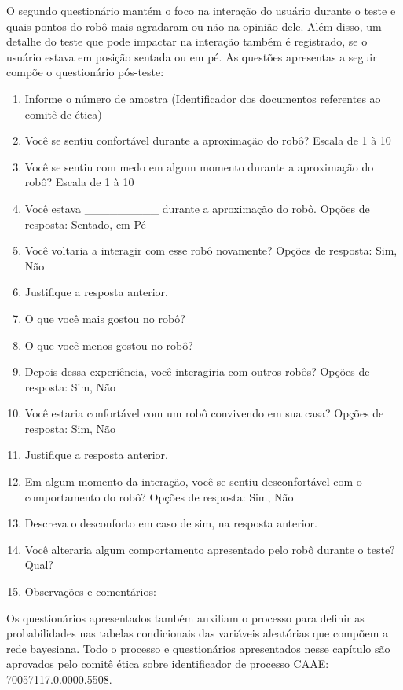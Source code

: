 O segundo questionário mantém o foco na interação do usuário durante o teste e quais pontos do robô mais agradaram ou não na opinião dele. Além disso, um detalhe do teste que pode impactar na interação também é registrado, se o usuário estava em posição sentada ou em pé. As questões apresentas a seguir compõe o questionário pós-teste:

\begin{enumerate}
	\item Informe o número de amostra (Identificador dos documentos referentes ao comitê de ética)
	\item Você se sentiu confortável durante a aproximação do robô? Escala de 1 à 10
	\item Você se sentiu com medo em algum momento durante a aproximação do robô? Escala de 1 à 10
	\item Você estava \_\_\_\_\_\_\_\_\_ durante a aproximação do robô. Opções de resposta: Sentado, em Pé
	\item Você voltaria a interagir com esse robô novamente? Opções de resposta: Sim, Não
	\item Justifique a resposta anterior.
	\item O que você mais gostou no robô?
	\item O que você menos gostou no robô?
	\item Depois dessa experiência, você interagiria com outros robôs? Opções de resposta: Sim, Não
	\item Você estaria confortável com um robô convivendo em sua casa? Opções de resposta: Sim, Não
	\item Justifique a resposta anterior.
	\item Em algum momento da interação, você se sentiu desconfortável com o comportamento do robô? Opções de resposta: Sim, Não
	\item Descreva o desconforto em caso de sim, na resposta anterior.
	\item Você alteraria algum comportamento apresentado pelo robô durante o teste? Qual?
	\item Observações e comentários:
\end{enumerate}

Os questionários apresentados também auxiliam o processo para definir as probabilidades nas tabelas condicionais das variáveis aleatórias que compõem a rede bayesiana. Todo o processo e questionários apresentados nesse capítulo são aprovados pelo comitê ética sobre identificador de processo CAAE: 70057117.0.0000.5508.

